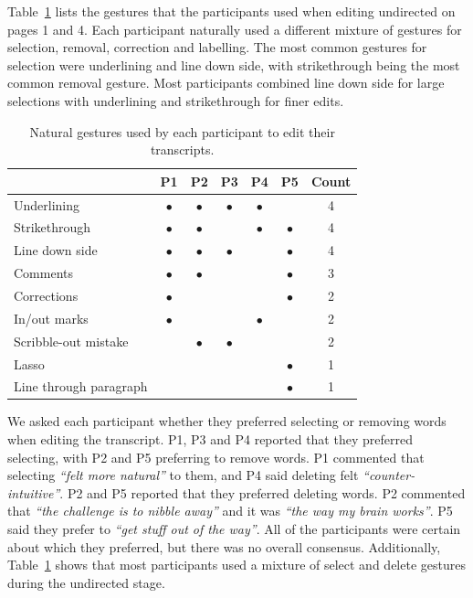 Table~\ref{tab:natural-gestures} lists the gestures that the participants used when editing undirected on pages 1 and
4.  Each participant naturally used a different mixture of gestures for selection, removal, correction and labelling.
The most common gestures for selection were underlining and line down side, with strikethrough being the most common
removal gesture.  Most participants combined line down side for large selections with underlining and strikethrough for
finer edits.

\begin{table}[h]
  \centering
  \begin{tabular}{l c c c c c c}
    \hline
    & \textbf{P1} & \textbf{P2} & \textbf{P3} & \textbf{P4} & \textbf{P5} & \textbf{Count} \\
    \hline
    Underlining               & $\bullet$ & $\bullet$ & $\bullet$ & $\bullet$ &           & 4 \\
    Strikethrough           & $\bullet$ & $\bullet$ &           & $\bullet$ & $\bullet$ & 4 \\
    Line down side          & $\bullet$ & $\bullet$ & $\bullet$ &           & $\bullet$ & 4 \\
    Comments                & $\bullet$ & $\bullet$ &           &           & $\bullet$ & 3 \\
    Corrections             & $\bullet$ &           &           &           & $\bullet$ & 2 \\
    In/out marks            & $\bullet$ &           &           & $\bullet$ &           & 2 \\
    Scribble-out mistake    &           & $\bullet$ & $\bullet$ &           &           & 2 \\
    Lasso                   &           &           &           &           & $\bullet$ & 1 \\
    Line through paragraph  &           &           &           &           & $\bullet$ & 1 \\
    \hline
  \end{tabular}
  \caption{Natural gestures used by each participant to edit their transcripts.}
  \label{tab:natural-gestures}
\end{table}

We asked each participant whether they preferred selecting or removing words when editing the transcript.  P1, P3 and
P4 reported that they preferred selecting, with P2 and P5 preferring to remove words.  P1 commented that selecting
\textit{``felt more natural''} to them, and P4 said deleting felt \textit{``counter-intuitive''}.  P2 and P5
reported that they preferred deleting words. P2 commented that \textit{``the challenge is to nibble away''} and it was
\textit{``the way my brain works''}.  P5 said they prefer to \textit{``get stuff out of the way''}.  All of the
participants were certain about which they preferred, but there was no overall consensus. Additionally,
Table~\ref{tab:natural-gestures} shows that most participants used a mixture of select and delete gestures during the
undirected stage.

